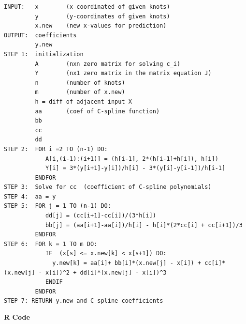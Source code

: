 \documentclass[
]{book}
\begin{document}
\begin{verbatim}
INPUT:   x        (x-coordinated of given knots)
         y        (y-coordinates of given knots)
         x.new    (new x-values for prediction)
OUTPUT:  coefficients
         y.new
STEP 1:  initialization
         A        (nxn zero matrix for solving c_i)
         Y        (nx1 zero matrix in the matrix equation J)
         n        (number of knots)
         m        (number of x.new)
         h = diff of adjacent input X
         aa       (coef of C-spline function)
         bb
         cc
         dd
STEP 2:  FOR i =2 TO (n-1) DO:
            A[i,(i-1):(i+1)] = (h[i-1], 2*(h[i-1]+h[i]), h[i])
            Y[i] = 3*(y[i+1]-y[i])/h[i] - 3*(y[i]-y[i-1])/h[i-1]
         ENDFOR
STEP 3:  Solve for cc  (coefficient of C-spline polynomials)
STEP 4:  aa = y
STEP 5:  FOR j = 1 TO (n-1) DO:
            dd[j] = (cc[i+1]-cc[i])/(3*h[i])
            bb[j] = (aa[i+1]-aa[i])/h[i] - h[i]*(2*cc[i] + cc[i+1])/3
         ENDFOR
STEP 6:  FOR k = 1 TO m DO:
            IF  (x[s] <= x.new[k] < x[s+1]) DO:
              y.new[k] = aa[i]+ bb[i]*(x.new[j] - x[i]) + cc[i]*(x.new[j] - x[i])^2 + dd[i]*(x.new[j] - x[i])^3
            ENDIF
         ENDFOR
STEP 7: RETURN y.new and C-spline coefficients
\end{verbatim}

\hfill\break

\textbf{R Code}
\end{document}
